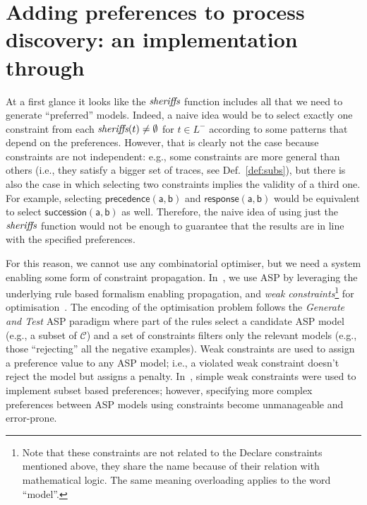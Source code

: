 
\section{Adding preferences to process discovery: an implementation through \asprin}
\label{sec:tool}

At a first glance it looks like the ${\textit{sheriffs}}$ function includes all that we need to generate ``preferred'' models. Indeed, a naive idea would be to select exactly one constraint from each ${\textit{sheriffs}}(t)\neq\emptyset$ for $t\in L^-$ according to some patterns that depend on the preferences. However, that is clearly not the case because constraints are not independent: e.g., some constraints are more general than others (i.e., they satisfy a bigger set of traces, see Def.~\ref{def:subs}), but there is also the case in which selecting two constraints implies the validity of a third one. For example, selecting $\mathsf{precedence(a,b)}$ and $\mathsf{response(a,b)}$ would be equivalent to select $\mathsf{succession(a,b)}$ as well. Therefore, the naive idea of using just the ${\textit{sheriffs}}$ function would not be enough to guarantee that the results are in line with the specified preferences. 

For this reason, we cannot use any combinatorial optimiser, but we need a system enabling some form of constraint propagation. In~\cite{deviant-tkde}, we use \ac{ASP} by leveraging the underlying rule based formalism enabling propagation, and \emph{weak constraints}\footnote{Note that these constraints are not related to the Declare constraints mentioned above, they share the name because of their relation with mathematical logic. The same meaning overloading applies to the word ``model''.} for optimisation~\cite{asp-intro,clingo}. The encoding of the optimisation problem follows the \emph{Generate and Test} \ac{ASP} paradigm where part of the rules select a candidate \ac{ASP} model (e.g., a subset of $\mathcal{C}$) and a set of constraints filters only the relevant models (e.g., those ``rejecting'' all the negative examples). Weak constraints are used to assign a preference value to any \ac{ASP} model; i.e., a violated weak constraint doesn't reject the model but assigns a penalty.
%
In~\cite{deviant-tkde}, simple weak constraints were used to implement subset based preferences; however, specifying more complex preferences between \ac{ASP} models using constraints become unmanageable and error-prone. 

